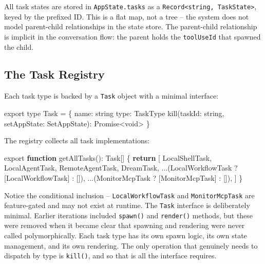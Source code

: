\documentclass[
  english,
  11pt,
  letterpaper,
]{book}
\newenvironment{Shaded}{\begin{snugshade}}{\end{snugshade}}
\newcommand{\BuiltInTok}[1]{\textcolor[rgb]{0.00,0.23,0.31}{#1}}
\newcommand{\ControlFlowTok}[1]{\textcolor[rgb]{0.00,0.23,0.31}{\textbf{#1}}}
\newcommand{\DataTypeTok}[1]{\textcolor[rgb]{0.68,0.00,0.00}{#1}}
\newcommand{\FunctionTok}[1]{\textcolor[rgb]{0.28,0.35,0.67}{#1}}
\newcommand{\ImportTok}[1]{\textcolor[rgb]{0.00,0.46,0.62}{#1}}
\newcommand{\KeywordTok}[1]{\textcolor[rgb]{0.00,0.23,0.31}{\textbf{#1}}}
\newcommand{\NormalTok}[1]{\textcolor[rgb]{0.00,0.23,0.31}{#1}}
\newcommand{\OperatorTok}[1]{\textcolor[rgb]{0.37,0.37,0.37}{#1}}
\begin{document}
All task states are stored in \texttt{AppState.tasks} as a
\texttt{Record\textless{}string,\ TaskState\textgreater{}}, keyed by the
prefixed ID. This is a flat map, not a tree -- the system does not model
parent-child relationships in the state store. The parent-child
relationship is implicit in the conversation flow: the parent holds the
\texttt{toolUseId} that spawned the child.

\subsection{The Task Registry}\label{the-task-registry}

Each task type is backed by a \texttt{Task} object with a minimal
interface:

\begin{Shaded}
\begin{Highlighting}[]
\ImportTok{export type}\NormalTok{ Task }\OperatorTok{=}\NormalTok{ \{}
\NormalTok{  name}\OperatorTok{:} \DataTypeTok{string}
\NormalTok{  type}\OperatorTok{:}\NormalTok{ TaskType}
  \FunctionTok{kill}\NormalTok{(taskId}\OperatorTok{:} \DataTypeTok{string}\OperatorTok{,}\NormalTok{ setAppState}\OperatorTok{:}\NormalTok{ SetAppState)}\OperatorTok{:} \BuiltInTok{Promise}\OperatorTok{\textless{}}\DataTypeTok{void}\OperatorTok{\textgreater{}}
\NormalTok{\}}
\end{Highlighting}
\end{Shaded}

The registry collects all task implementations:

\begin{Shaded}
\begin{Highlighting}[]
\ImportTok{export} \KeywordTok{function} \FunctionTok{getAllTasks}\NormalTok{()}\OperatorTok{:}\NormalTok{ Task[] \{}
  \ControlFlowTok{return}\NormalTok{ [}
\NormalTok{    LocalShellTask}\OperatorTok{,}
\NormalTok{    LocalAgentTask}\OperatorTok{,}
\NormalTok{    RemoteAgentTask}\OperatorTok{,}
\NormalTok{    DreamTask}\OperatorTok{,}
    \OperatorTok{...}\NormalTok{(LocalWorkflowTask }\OperatorTok{?}\NormalTok{ [LocalWorkflowTask] }\OperatorTok{:}\NormalTok{ [])}\OperatorTok{,}
    \OperatorTok{...}\NormalTok{(MonitorMcpTask }\OperatorTok{?}\NormalTok{ [MonitorMcpTask] }\OperatorTok{:}\NormalTok{ [])}\OperatorTok{,}
\NormalTok{  ]}
\NormalTok{\}}
\end{Highlighting}
\end{Shaded}

Notice the conditional inclusion -- \texttt{LocalWorkflowTask} and
\texttt{MonitorMcpTask} are feature-gated and may not exist at runtime.
The \texttt{Task} interface is deliberately minimal. Earlier iterations
included \texttt{spawn()} and \texttt{render()} methods, but these were
removed when it became clear that spawning and rendering were never
called polymorphically. Each task type has its own spawn logic, its own
state management, and its own rendering. The only operation that
genuinely needs to dispatch by type is \texttt{kill()}, and so that is
all the interface requires.
\end{document}
